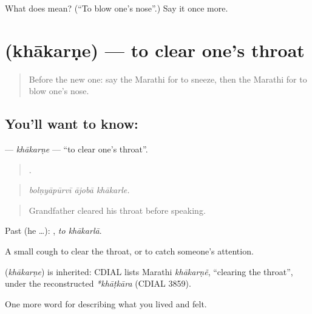 \begin{tcolorbox}[breakable,colback=teal!4,colframe=teal!35!black,title={Before you move on}]
What does  mean? (\textquotedblleft{}To blow one's nose\textquotedblright{}.) Say it once more.
\end{tcolorbox}
\section[\texorpdfstring{\mr{खाकरणे} (khākarṇe)}{खाकरणे (khākarṇe)}]{ (khākarṇe) — to clear one's throat}

\label{lesson:MR-C481-khakarne}



\begin{quote}
Before the new one: say the Marathi for to sneeze, then the Marathi for to blow one's nose.
\end{quote}

\subsection*{You'll want to know: }
\textbf{} — \emph{khākarṇe} — \textquotedblleft{}to clear one's throat\textquotedblright{}.

\begin{quote}
  .
\end{quote}

\begin{quote}
\emph{bolṇyāpūrvī ājobā khākarle.}
\end{quote}

\begin{quote}
Grandfather cleared his throat before speaking.
\end{quote}

Past (he …):  , \emph{to khākarlā}.

A small cough to clear the throat, or to catch someone's attention.

\begin{cousinweb}
\textbf{} (\emph{khākarṇe}) is inherited: CDIAL lists Marathi \emph{khākarṇẽ}, \textquotedblleft{}clearing the throat\textquotedblright{}, under the reconstructed \emph{*khāṭkāra} (CDIAL 3859).
\end{cousinweb}

\begin{grammarlens}[title={What you've built}]
One more word for describing what you lived and felt.
\end{grammarlens}

